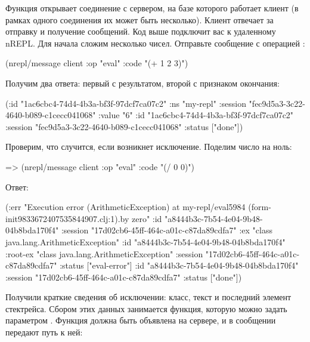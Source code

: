 Функция  открывает соединение с сервером, на базе которого работает клиент (в рамках одного соединения их может быть несколько). Клиент отвечает за отправку и получение сообщений. Код выше подключит вас к удаленному nREPL. Для начала сложим несколько чисел. Отправьте сообщение с операцией :

\begin{english}
  \begin{clojure}
(nrepl/message client {:op "eval" :code "(+ 1 2 3)"})
  \end{clojure}
\end{english}

Получим два ответа: первый с результатом, второй с признаком окончания:

\begin{english}
  \begin{clojure}
({:id "1ac6cbc4-74d4-4b3a-bf3f-97dcf7ca07c2"
  :ns "my-repl"
  :session "fec9d5a3-3c22-4640-b089-c1cecc041068"
  :value "6"}
 {:id "1ac6cbc4-74d4-4b3a-bf3f-97dcf7ca07c2"
  :session "fec9d5a3-3c22-4640-b089-c1cecc041068"
  :status ["done"]})
  \end{clojure}
\end{english}

Проверим, что случится, если возникнет исключение. Поделим число на ноль:

\begin{english}
  \begin{clojure}
=> (nrepl/message client {:op "eval" :code "(/ 0 0)"})
  \end{clojure}
\end{english}

Ответ:

\begin{english}
  \begin{clojure}
({:err "Execution error (ArithmeticException) at my-repl/eval5984 (form-init9833672407535844907.clj:1).\nDivide by zero\n"
  :id "a8444b3c-7b54-4e04-9b48-04b8bda170f4"
  :session "17d02cb6-45ff-464c-a01c-c87da89cdfa7"}
 {:ex "class java.lang.ArithmeticException"
  :id "a8444b3c-7b54-4e04-9b48-04b8bda170f4"
  :root-ex "class java.lang.ArithmeticException"
  :session "17d02cb6-45ff-464c-a01c-c87da89cdfa7"
  :status ["eval-error"]}
 {:id "a8444b3c-7b54-4e04-9b48-04b8bda170f4"
  :session "17d02cb6-45ff-464c-a01c-c87da89cdfa7" :status ["done"]})
  \end{clojure}
\end{english}

Получили краткие сведения об исключении: класс, текст и последний элемент стектрейса. Сбором этих данных занимается функция, которую можно задать параметром . Функция должна быть объявлена на сервере, и в сообщении передают путь к ней:

